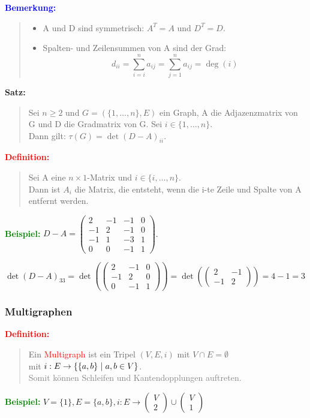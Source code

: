 \documentclass{article}
\newcommand{\smsp}{\phantom{\hspace{3px}}}
\newcommand{\red}[1]{\textcolor{red}{#1}}
\newcommand{\gray}[1]{\textcolor{gray}{#1}}
\newcommand{\blue}[1]{\textcolor{blue}{#1}}
\newcommand{\green}[1]{\textcolor{green}{#1}}
\newcommand{\dgr}[1]{\textcolor{dgr}{#1}}
\newcommand{\ex}{\green{\textbf{Beispiel: }}}
\newcommand{\de}[1]{\red{\textbf{Definition: }}\begin{quote}#1\end{quote}}
\newcommand{\an}[1]{\blue{\textbf{Bemerkung: }}\begin{quote}#1\end{quote}}
\newcommand{\se}[1]{\dgr{\textbf{Satz: }}\begin{quote}#1\end{quote}}
\renewcommand{\st}{\smsp | \smsp}
\newcommand{\vvec}[2]{\begin{pmatrix}#1\\#2\end{pmatrix}}
\begin{document}
\an{
    \begin{itemize}
        \item A und D sind symmetrisch: $A^T = A$ und $D^T = D$.
        \item Spalten- und Zeilensummen von A sind der Grad:
        \[
            d_{ii} = \sum_{i=i}^{n} a_{ij} = \sum_{j=1}^{n} a_{ij} = \deg(i)
        \]
    \end{itemize}
}

\se{
    Sei $n \geq 2$ und $G = (\{1, \dots, n\}, E)$ ein Graph, A die Adjazenzmatrix von G und D die Gradmatrix von G. Sei $i \in \{1, \dots, n\}$.\\
    Dann gilt: $\tau(G) = \det(D-A)_{ii}$.
}

\de{
    Sei A eine $n \times 1$-Matrix und $i \in \{i, \dots, n\}$.\\
    Dann ist $A_i$ die Matrix, die entsteht, wenn die i-te Zeile und Spalte von A entfernt werden.
}

\ex $D-A = \begin{pmatrix}
    2 & -1 & -1 & 0\\
    -1 & 2 & -1 & 0\\
    -1 & 1 & -3& 1\\
    0 & 0 & -1 & 1
\end{pmatrix}$.

$\det(D-A)_{33} = \det(\begin{pmatrix}
    2 & -1 & 0\\
    -1 & 2 & 0\\
    0 & -1 & 1
\end{pmatrix}) = \det(\begin{pmatrix}
    2 & -1\\
    -1 & 2
\end{pmatrix}) = 4 - 1 = 3$

\subsubsection{Multigraphen}

\de{
    Ein \red{Multigraph} ist ein Tripel $(V, E, i)$ mit $V \cap E = \emptyset$\\
    mit $i : E \to \{\{a,b\} \st a,b \in V\}$.\\
    \gray{
        Somit können Schleifen und Kantendopplungen auftreten.
    }
}

\ex $V = \{1\}, E = \{a,b\}, i: E \to \vvec{V}{2} \cup \vvec{V}{1}$
\end{document}
